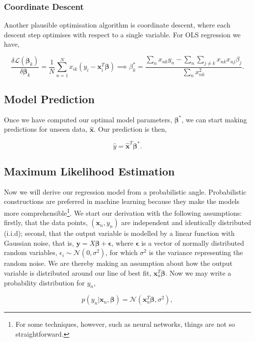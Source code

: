 \documentclass[11pt]{amsart}
\begin{document}
\subsubsection{Coordinate Descent}

Another plausible optimisation algorithm is coordinate descent, where each descent step optimises with respect to a single variable. For OLS regression we have,

$$
\frac{\delta\mathcal{L}(\boldsymbol\beta_k)}{\delta\boldsymbol\beta_k} = \frac{1}{N}\sum_{n=1}^N x_{ik}(y_i - \mathbf{x}_i^T\boldsymbol\beta)
\implies \beta_k^* = \frac{\sum_n x_{nk}y_n - \sum_n\sum_{j \neq k}x_{nk} x_{nj}\beta_j}{\sum_n x_{nk}^2}.
$$

\subsection{Model Prediction}

Once we have computed our optimal model parameters, $\boldsymbol\beta^*$, we can start making predictions for unseen data, $\hat{\mathbf{x}}$. Our prediction is then,

$$\hat{y} = \hat{\mathbf{x}}^T\boldsymbol\beta^*.$$

\subsection{Maximum Likelihood Estimation}

Now we will derive our regression model from a probabilistic angle. Probabilistic constructions are preferred in machine learning because they make the models more comprehensible\footnote{For some techniques, however, such as neural networks, things are not so straightforward.}. We start our derivation with the following assumptions: firstly, that the data points, $(\mathbf{x}_n, y_n)$ are independent and identically distributed (i.i.d); second, that the output variable is modelled by a linear function with Gaussian noise, that is, $\mathbf{y} = X\boldsymbol\beta + \boldsymbol\epsilon$, where $\boldsymbol\epsilon$ is a vector of normally distributed random variables, $\epsilon_i \sim \mathcal{N}(0, \sigma^2)$, for which $\sigma^2$ is the variance representing the random noise. We are thereby making an assumption about how the output variable is distributed around our line of best fit, $\mathbf{x}_n^T\boldsymbol\beta$. Now we may write a probability distribution for $y_n$,

$$p(y_n|\mathbf{x}_n, \boldsymbol\beta) = \mathcal{N}(\mathbf{x}_n^T\boldsymbol\beta, \sigma^2),$$
\end{document}
